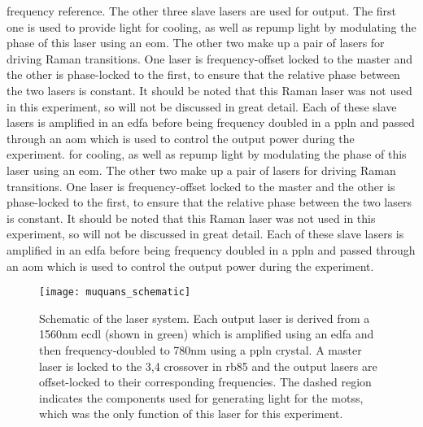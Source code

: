frequency reference. The other three slave lasers are used for output. The first one is used to provide light for cooling, as well as repump light by modulating the phase of this laser using an \ac{eom}. The other two make up a pair of lasers for driving Raman transitions. One laser is frequency-offset locked to the master and the other is phase-locked to the first, to ensure that the relative phase between the two lasers is constant. It should be noted that this Raman laser was not used in this experiment, so will not be discussed in great detail. Each of these slave lasers is amplified in an \ac{edfa} before being frequency doubled in a \ac{ppln} and passed through an \ac{aom} which is used to control the output power during the experiment.  for cooling, as well as repump light by modulating the phase of this laser using an \ac{eom}. The other two make up a pair of lasers for driving Raman transitions. One laser is frequency-offset locked to the master and the other is phase-locked to the first, to ensure that the relative phase between the two lasers is constant. It should be noted that this Raman laser was not used in this experiment, so will not be discussed in great detail. Each of these slave lasers is amplified in an \ac{edfa} before being frequency doubled in a \ac{ppln} and passed through an \ac{aom} which is used to control the output power during the experiment. 
\begin{figure}
    \texttt{[image: muquans\_schematic]}
    \caption[\Muquans Laser System Diagram]{Schematic of the \Muquans laser system. Each output laser is derived from a 1560nm \acs{ecdl} (shown in green) which is amplified using an \acs{edfa} and then frequency-doubled to 780nm using a \acs{ppln} crystal. A master laser is locked to the 3,4 crossover in \ac{rb85} and the output lasers are offset-locked to their corresponding frequencies. The dashed region indicates the components used for generating light for the \acp{mots}, which was the only function of this laser for this experiment.}\label{fig:muquans_schematic}
\end{figure}
